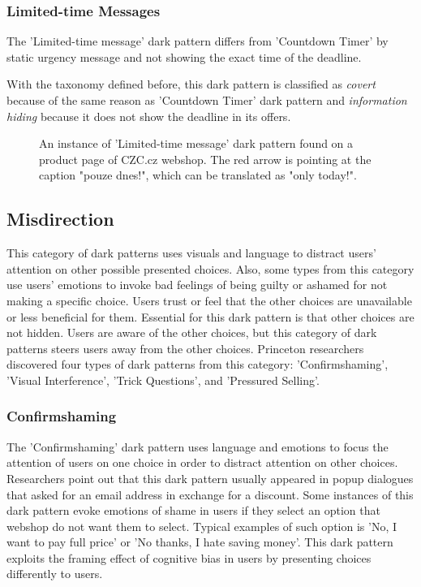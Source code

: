         \subsubsection{Limited-time Messages}
        The 'Limited-time message' dark pattern differs from 'Countdown Timer' by static urgency message and not showing the exact time of the deadline. 
        
        With the taxonomy defined before, this dark pattern is classified as \emph{covert} because of the same reason as 'Countdown Timer' dark pattern and \emph{information hiding} because it does not show the deadline in its offers.

        \begin{figure}[ht]
            \centering
            \caption{An instance of 'Limited-time message' dark pattern found on a product page of CZC.cz webshop. The red arrow is pointing at the caption "pouze dnes!", which can be translated as "only today!".}
            \label{fig:limited-time-message-czc}
        \end{figure}

    \subsection{Misdirection}
    This category of dark patterns uses visuals and language to distract users' attention on other possible presented choices. Also, some types from this category use users' emotions to invoke bad feelings of being guilty or ashamed for not making a specific choice. Users trust or feel that the other choices are unavailable or less beneficial for them. Essential for this dark pattern is that other choices are not hidden. Users are aware of the other choices, but this category of dark patterns steers users away from the other choices. Princeton researchers discovered four types of dark patterns from this category: 'Confirmshaming', 'Visual Interference', 'Trick Questions', and 'Pressured Selling'.
        \subsubsection{Confirmshaming}
        The 'Confirmshaming' dark pattern uses language and emotions to focus the attention of users on one choice in order to distract attention on other choices. Researchers point out that this dark pattern usually appeared in popup dialogues that asked for an email address in exchange for a discount. Some instances of this dark pattern evoke emotions of shame in users if they select an option that webshop do not want them to select. Typical examples of such option is 'No, I want to pay full price' or 'No thanks, I hate saving money'. This dark pattern exploits the framing effect of cognitive bias in users by presenting choices differently to users.
        
